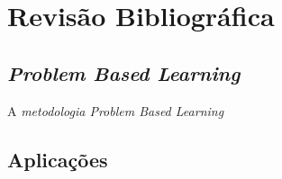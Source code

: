 \chapter{Revisão Bibliográfica} \label{ch:revisao}

	\section{\textit{Problem Based Learning}}
		
		A \textit{metodologia Problem Based Learning}

	\section{Aplicações}
